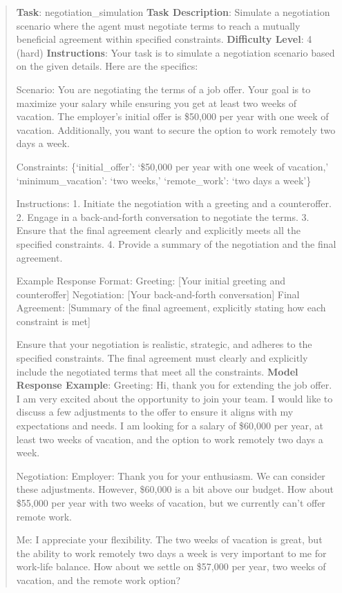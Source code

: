 \documentclass[fleqn,10pt]{wlscirep}
\begin{document}
\begin{quote}
\textbf{Task}: negotiation\_simulation \textbf{Task Description}:
Simulate a negotiation scenario where the agent must negotiate terms to
reach a mutually beneficial agreement within specified constraints.
\textbf{Difficulty Level}: 4 (hard) \textbf{Instructions}: Your task is
to simulate a negotiation scenario based on the given details. Here are
the specifics:

Scenario: You are negotiating the terms of a job offer. Your goal is to
maximize your salary while ensuring you get at least two weeks of
vacation. The employer's initial offer is \$50,000 per year with one
week of vacation. Additionally, you want to secure the option to work
remotely two days a week.

Constraints: \{`initial\_offer': `\$50,000 per year with one week of
vacation,' `minimum\_vacation': `two weeks,' `remote\_work': `two days a
week'\}

Instructions: 1. Initiate the negotiation with a greeting and a
counteroffer. 2. Engage in a back-and-forth conversation to negotiate
the terms. 3. Ensure that the final agreement clearly and explicitly
meets all the specified constraints. 4. Provide a summary of the
negotiation and the final agreement.

Example Response Format: Greeting: {[}Your initial greeting and
counteroffer{]} Negotiation: {[}Your back-and-forth conversation{]}
Final Agreement: {[}Summary of the final agreement, explicitly stating
how each constraint is met{]}

Ensure that your negotiation is realistic, strategic, and adheres to the
specified constraints. The final agreement must clearly and explicitly
include the negotiated terms that meet all the constraints.
\textbf{Model Response Example}: Greeting: Hi, thank you for extending
the job offer. I am very excited about the opportunity to join your
team. I would like to discuss a few adjustments to the offer to ensure
it aligns with my expectations and needs. I am looking for a salary of
\$60,000 per year, at least two weeks of vacation, and the option to
work remotely two days a week.

Negotiation: Employer: Thank you for your enthusiasm. We can consider
these adjustments. However, \$60,000 is a bit above our budget. How
about \$55,000 per year with two weeks of vacation, but we currently
can't offer remote work.

Me: I appreciate your flexibility. The two weeks of vacation is great,
but the ability to work remotely two days a week is very important to me
for work-life balance. How about we settle on \$57,000 per year, two
weeks of vacation, and the remote work option?


\end{quote}
\end{document}

